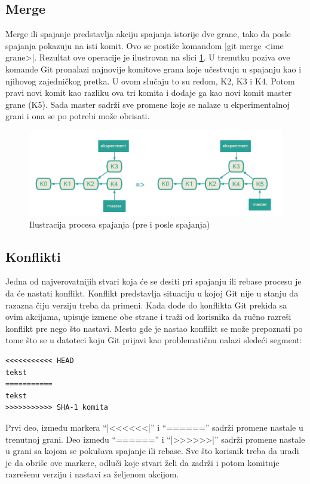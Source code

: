 \documentclass[a4paper]{article}
\begin{document}
{\subsection{Merge}
\label{subsec:merge}
Merge ili spajanje predstavlja akciju spajanja istorije dve grane, tako da posle spajanja pokazuju na isti komit. Ovo se postiže komandom |git merge <ime grane>|. Rezultat ove operacije je ilustrovan na slici \ref{fig:merge}. U trenutku poziva ove komande Git pronalazi najnovije komitove grana koje učestvuju u spajanju kao i njihovog zajedničkog pretka. U ovom slučaju to su redom, K2, K3 i K4. Potom pravi novi komit kao razliku ova tri komita i dodaje ga kao novi komit master grane (K5). Sada master sadrži sve promene koje se nalaze u ekperimentalnoj grani i ona se po potrebi može obrisati.
\begin{figure}[h!]
\begin{center}
\includegraphics[scale=0.3]{images/merge.png}
\end{center}
\caption{Ilustracija procesa spajanja (pre i posle spajanja)}
\label{fig:merge}
\end{figure}

\subsection{Konflikti}
\label{subsec:konflikti}
Jedna od najverovatnijih stvari koja će se desiti pri spajanju ili rebase procesu je da će nastati konflikt. Konflikt predstavlja situaciju u kojoj Git nije u stanju da razazna čiju verziju treba da primeni. Kada dođe do konflikta Git prekida sa ovim akcijama, upisuje izmene obe strane i traži od korisnika da ručno razreši konflikt pre nego što nastavi. Mesto gde je nastao konflikt se može prepoznati po tome što se u datoteci koju Git prijavi kao problematičnu nalazi sledeći segment:
\begin{lstlisting}
<<<<<<<<<<< HEAD
tekst
===========
tekst
>>>>>>>>>>> SHA-1 komita
\end{lstlisting}
Prvi deo, između markera ``|<<<<<<|'' i ``======'' sadrži promene nastale u trenutnoj grani. Deo između  ``======'' i ``|>>>>>>|'' sadrži promene nastale u grani sa kojom se pokušava spajanje ili rebase. Sve što korisnik treba da uradi je da obriše ove markere, odluči koje stvari želi da zadrži i potom komituje razrešenu verziju i nastavi sa željenom akcijom.
}
\end{document}
